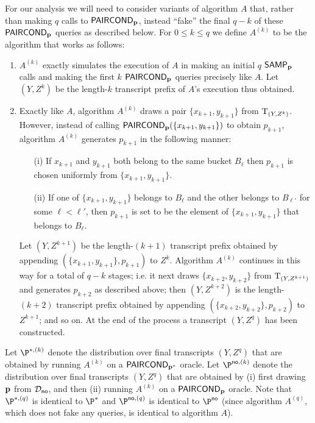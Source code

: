 For our analysis we will need to consider variants of algorithm $A$
that, rather than making $q$ calls to ${\sf PAIRCOND}_{\mathbf{p}}$, instead ``fake''
the final $q-k$ of these ${\sf PAIRCOND}_{\mathbf{p}}$ queries as described below.
For $0 \leq k \leq q$ we define $A^{(k)}$ to be the algorithm
that works as follows:

\begin{enumerate}

\item $A^{(k)}$ exactly simulates the execution of $A$ in making
an initial $q$ ${\sf SAMP}_{\mathbf{p}}$ calls and making the first $k$ ${\sf PAIRCOND}_{\mathbf{p}}$
queries precisely like $A$.  Let $(Y,Z^{k})$ be the length-$k$ transcript
prefix of $A$'s execution thus obtained.

\item Exactly like $A$, algorithm $A^{(k)}$ draws a pair
$\{x_{k+1},y_{k+1}\}$ from ${\rm T}_{(Y,Z^k)}$.
However, instead of calling ${\sf PAIRCOND}_{\mathbf{p}}(\{x_{k+1},y_{k+1}\})$
to obtain $p_{k+1}$, algorithm $A^{(k)}$ generates $p_{k+1}$
in the following manner:

\begin{itemize}

\item [(i)] If $x_{k+1}$ and $y_{k+1}$ both belong to the same bucket $B_\ell$
then $p_{k+1}$ is chosen uniformly from $\{x_{k+1},y_{k+1}\}.$

\item [(ii)] If one of $\{x_{k+1},y_{k+1}\}$ belongs to $B_\ell$
and the other belongs to $B_{\ell'}$ for some $\ell < \ell'$,
then $p_{k+1}$ is set to be the element of
$\{x_{k+1},y_{k+1}\}$ that belongs to $B_\ell$.

\end{itemize}

Let $(Y,Z^{k+1})$ be the length-$(k+1)$ transcript prefix
obtained by appending $(\{x_{k+1},y_{k+1}\},p_{k+1})$ to $Z^k$.
Algorithm $A^{(k)}$ continues in this way for a total of $q-k$ stages; i.e.
it next draws $\{x_{k+2},y_{k+2}\}$ from ${\rm T}_{(Y,Z^{k+1})}$ and
generates $p_{k+2}$ as described above; then $(Y,Z^{k+2})$ is
the length-$(k+2)$ transcript prefix obtained by
appending $(\{x_{k+2},y_{k+2}\},p_{k+2})$ to $Z^{k+1}$;
and so on.  At the end of the process a transcript
$(Y,Z^q)$ has been constructed.

\end{enumerate}

Let $\P^{\ast,(k)}$ denote the distribution over final
transcripts $(Y,Z^q)$ that are obtained by running $A^{(k)}$ on a
${\sf PAIRCOND}_{\mathbf{p}^\ast}$ oracle.
Let $\P^{\text \no,(k)}$ denote the distribution over final
transcripts $(Y,Z^q)$ that are obtained by (i) first drawing
$\mathbf{p}$ from $\mathcal{D}_{\textsf{no}}$, and then (ii) running $A^{(k)}$ on a
${\sf PAIRCOND}_{\mathbf{p}}$ oracle.
Note that $\P^{\ast,(q)}$ is identical to $\P^\ast$
and $\P^{\text \no, (q)}$ is identical to $\P^{\text \no}$
(since algorithm $A^{(q)}$, which does not fake any queries,
is identical to algorithm $A$).

